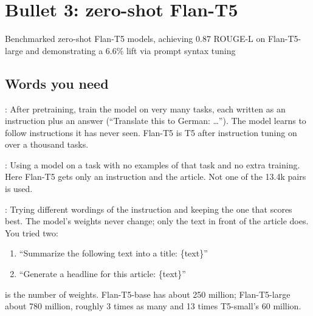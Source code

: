 \chapter{Bullet 3: zero-shot Flan-T5}
\label{ch:flan}

\begin{cvline}
Benchmarked zero-shot Flan-T5 models, achieving 0.87 ROUGE-L on Flan-T5-large and demonstrating a 6.6\% lift via prompt syntax tuning
\end{cvline}

\section{Words you need}

\begin{definition}
: After pretraining, train the model on very many tasks, each written as an instruction plus an answer (``Translate this to German: \dots''). The model learns to follow instructions it has never seen. Flan-T5 is T5 after instruction tuning on over a thousand tasks.
\end{definition}

\begin{definition}
: Using a model on a task with no examples of that task and no extra training. Here Flan-T5 gets only an instruction and the article. Not one of the 13.4k pairs is used.
\end{definition}

\begin{definition}
: Trying different wordings of the instruction and keeping the one that scores best. The model's weights never change; only the text in front of the article does. You tried two:
\begin{enumerate}
  \item ``Summarize the following text into a title: \{text\}''
  \item ``Generate a headline for this article: \{text\}''
\end{enumerate}
\end{definition}

\begin{definition}
 is the number of weights. Flan-T5-base has about 250 million; Flan-T5-large about 780 million, roughly 3 times as many and 13 times T5-small's 60 million.
\end{definition}

